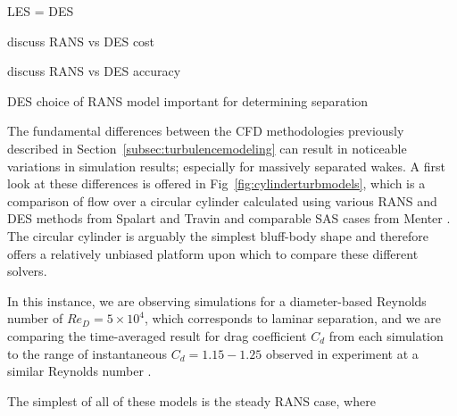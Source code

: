 \documentclass[journal]{new-aiaa}
\begin{document}
LES = DES

discuss RANS vs DES cost

discuss RANS vs DES accuracy

DES choice of RANS model important for determining separation

The fundamental differences between the CFD methodologies previously described in Section~\ref{subsec:turbulencemodeling} can result in noticeable variations in simulation results; especially for massively separated wakes. A first look at these differences is offered in Fig~\ref{fig:cylinderturbmodels}, which is a comparison of flow over a circular cylinder calculated using various RANS and DES methods from Spalart and Travin \cite{spalart2009detachededdy} and comparable SAS cases from Menter \cite{menter2005scaleadaptive}. The circular cylinder is arguably the simplest bluff-body shape and therefore offers a relatively unbiased platform upon which to compare these different solvers.

In this instance, we are observing simulations for a diameter-based Reynolds number of $Re_D = 5 \times 10^4$, which corresponds to laminar separation, and we are comparing the time-averaged result for drag coefficient $C_d$ from each simulation to the range of instantaneous $C_d=1.15-1.25$ observed in experiment at a similar Reynolds number \cite{travin2000detachededdy}.

The simplest of all of these models is the steady RANS case, where
\end{document}
